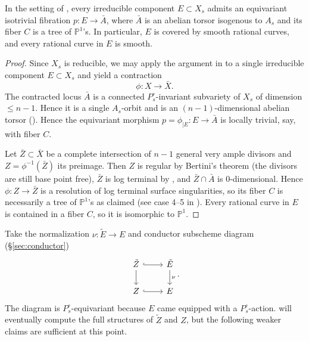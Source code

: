 \documentclass[reqno, letterpaper]{amsart}
\numberwithin{equation}{subsection}
\let\to\longrightarrow
\newcommand{\PP}{\mathbb{P}}
\begin{document}
		\begin{lemma} \label{lem:prop:E step 1}
			In the setting of , every irreducible component $E \subset X_s$ admits an equivariant isotrivial fibration $p : E \to \bar A$, where $\bar A$ is an abelian torsor isogenous to $A_s$ and its fiber $C$ is a tree of $\PP^1$'s. In particular, $E$ is covered by smooth rational curves, and every rational curve in $E$ is smooth.
		\end{lemma}
		\begin{proof}
			Since $X_s$ is reducible, we may apply the argument in  to a single irreducible component $E \subset X_s$ and yield a contraction
			\[ \phi : X \to \bar X .\]
			The contracted locus $\bar A$ is a connected $P^\circ_s$-invariant subvariety of $X_s$ of dimension $\le n-1$. Hence it is a single $A_s$-orbit and is an $(n-1)$-dimensional abelian torsor (). Hence the equivariant morphism $p = \phi_{|E} : E \to \bar A$ is locally trivial, say, with fiber $C$.
			
			Let $\bar Z \subset \bar X$ be a complete intersection of $n-1$ general very ample divisors and $Z = \phi^{-1}(\bar Z)$ its preimage. Then $Z$ is regular by Bertini's theorem (the divisors are still base point free), $\bar Z$ is log terminal by \cite[Lemma~5.17]{kol-mori}, and $\bar Z \cap \bar A$ is $0$-dimensional. Hence $\phi : Z \to \bar Z$ is a resolution of log terminal surface singularities, so its fiber $C$ is necessarily a tree of $\PP^1$'s as claimed (see case 4--5 in \cite[Theorem~4.7]{kol-mori}). Every rational curve in $E$ is contained in a fiber $C$, so it is isomorphic to $\PP^1$.
		\end{proof}
		
		Take the normalization $\nu : \tilde E \to E$ and conductor subscheme diagram (\S \ref{sec:conductor})
		\begin{equation} \label{diag:conductor of E}
		\begin{tikzcd}
			\tilde Z \arrow[r, hook] \arrow[d] & \tilde E \arrow[d, "\nu"] \\
			Z \arrow[r, hook] & E
		\end{tikzcd}.
		\end{equation}
		The diagram is $P^\circ_s$-equivariant because $E$ came equipped with a $P^\circ_s$-action.  will eventually compute the full structures of $\tilde Z$ and $Z$, but the following weaker claims are sufficient at this point.
		
\end{document}
